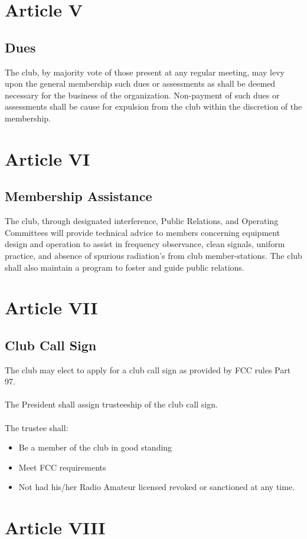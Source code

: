 \documentclass[english,12pt,letterpaper]{article}
\begin{document}
	\section*{Article V}
	\subsection*{Dues}
	The club, by majority vote of those present at any regular meeting, may levy upon the general membership such dues or assessments as shall be deemed necessary for the business of the organization. Non-payment of such dues or assessments shall be cause for expulsion from the club within the discretion of the membership.
	\section*{Article VI}
	\subsection*{Membership Assistance}
	The club, through designated interference, Public Relations, and Operating Committees will provide technical advice to members concerning equipment design and operation to assist in frequency observance, clean signals, uniform practice, and absence of spurious radiation's from club member-stations. The club shall also maintain a program to foster and guide public relations.
	\section*{Article VII}
	\subsection*{Club Call Sign}
	The club may elect to apply for a club call sign as provided by FCC rules Part 97. \\
	\\
	The President shall assign trusteeship of the club call sign. \\
	\\
	The trustee shall: \\
	\begin{itemize}
		\item Be a member of the club in good standing
		\item Meet FCC requirements
		\item Not had his/her Radio Amateur licensed revoked or sanctioned at any time.
	\end{itemize}
	\section*{Article VIII}
\end{document}

